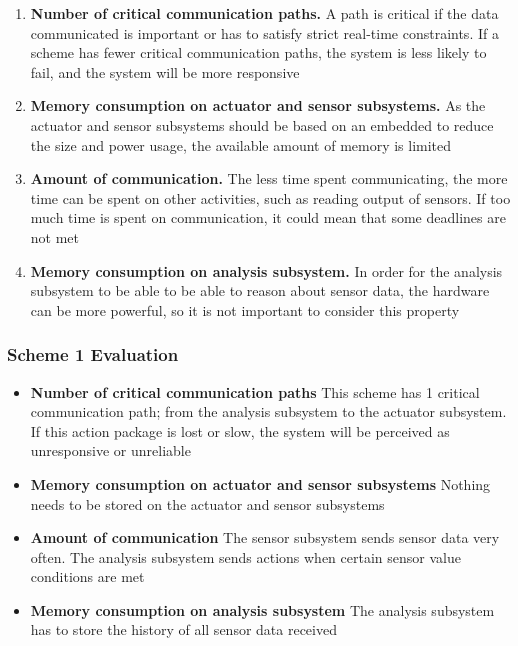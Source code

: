 \begin{enumerate}
\item \textbf{Number of critical communication paths.} A path is critical if the data communicated is important or has to satisfy strict real-time constraints. If a scheme has fewer critical communication paths, the system is less likely to fail, and the system will be more responsive
\item \textbf{Memory consumption on actuator and sensor subsystems.} As the actuator and sensor subsystems should be based on an embedded to reduce the size and power usage, the available amount of memory is limited
\item \textbf{Amount of communication.} The less time spent communicating, the more time can be spent on other activities, such as reading output of sensors. If too much time is spent on communication, it could mean that some deadlines are not met
\item \textbf{Memory consumption on analysis subsystem.} In order for the analysis subsystem to be able to be able to reason about sensor data, the hardware can be more powerful, so it is not important to consider this property
\end{enumerate}

\subsubsection{Scheme 1 Evaluation}
\begin{itemize}
\item \textbf{Number of critical communication paths} This scheme has 1 critical communication path; from the analysis subsystem to the actuator subsystem. If this action package is lost or slow, the system will be perceived as unresponsive or unreliable
\item \textbf{Memory consumption on actuator and sensor subsystems} Nothing needs to be stored on the actuator and sensor subsystems
\item \textbf{Amount of communication} The sensor subsystem sends sensor data very often. The analysis subsystem sends actions when certain sensor value conditions are met
\item \textbf{Memory consumption on analysis subsystem} The analysis subsystem has to store the history of all sensor data received
\end{itemize}

